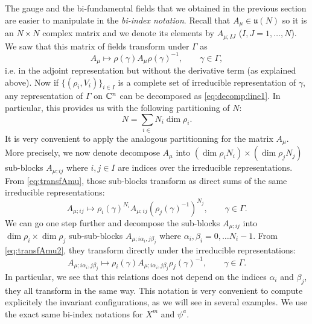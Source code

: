             The gauge and the bi-fundamental fields that we obtained in the previous section are easier to manipulate in the \emph{bi-index notation}. Recall that $A_\mu\in\mathfrak{u}(N)$ so it is an $N\times N$ complex matrix and we denote its elements by $A_{\mu;IJ}$ ($I,J=1,\dots,N$). We saw that this matrix of fields transform under $\Gamma$ as
            \begin{equation}
                A_\mu\mapsto \rho(\gamma)A_\mu \rho(\gamma)^{-1},\qquad \gamma\in \Gamma,\label{eq:transfAmu1}
            \end{equation}
            i.e. in the adjoint representation but without the derivative term (as explained above). Now if $\{(\rho_i,V_i)\}_{i\in I}$ is a complete set of irreducible representation of $\gamma$, any representation of $\Gamma$ on $\mathbb{C}^n$ can be decomposed as \eqref{eq:decomp:line1}. In particular, this provides us with the following partitioning of $N$:
            \begin{equation}
                N=\sum_{i\in}N_i\dim\rho_i.
            \end{equation}
            It is very convenient to apply the analogous partitionning for the matrix $A_\mu$. More precisely, we now denote decompose $A_\mu$ into $(\dim\rho_iN_i)\times(\dim\rho_jN_j)$ sub-blocks $A_{\mu;ij}$ where $i,j\in I$ are indices over the irreducible representations. From \eqref{eq:transfAmu}, those sub-blocks transform as direct sums of the same irreducible representations:
            \begin{equation}
                A_{\mu;ij}\mapsto \rho_i(\gamma)^{N_i}A_{\mu;ij}(\rho_j(\gamma)^{-1})^{N_j},\qquad \gamma\in\Gamma.\label{eq:transfAmu2}
            \end{equation}
            We can go one step further and decompose the sub-blocks $A_{\mu;ij}$ into $\dim\rho_i\times\dim\rho_j$ sub-sub-blocks $A_{\mu;i\alpha_i,j\beta_j}$ where $\alpha_i,\beta_i=0,\dots N_i-1$. From \eqref{eq:transfAmu2}, they transform directly under the irreducible representations:
            \begin{equation}
                \boxed{A_{\mu;i\alpha_i,j\beta_j}\mapsto\rho_i(\gamma)A_{\mu;i\alpha_i,j\beta_j}\rho_j(\gamma)^{-1},\qquad \gamma\in\Gamma.}
            \end{equation}
            In particular, we see that this relations does not depend on the indices $\alpha_i$ and $\beta_j$, they all transform in the same way. This notation is very convenient to compute explicitely the invariant configurations, as we will see in several examples. We use the exact same bi-index notations for $X^m$ and $\psi^a$.

